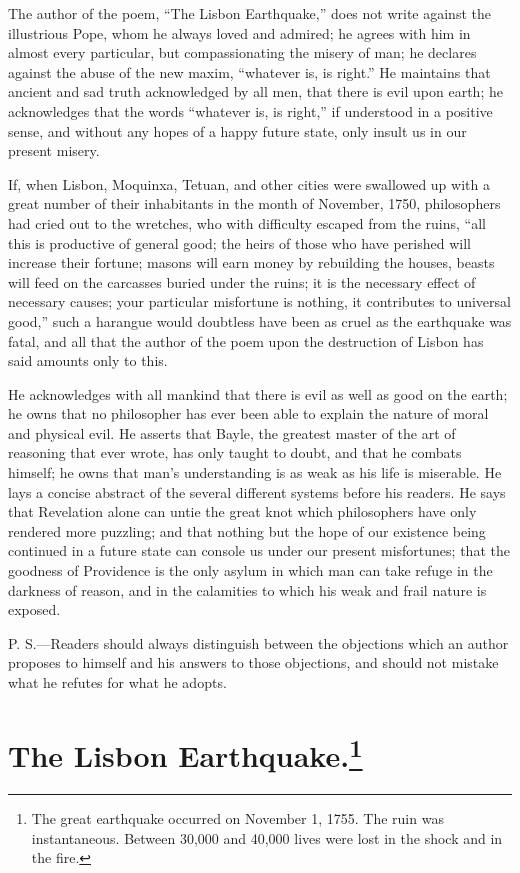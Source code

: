 The author of the poem, ``The Lisbon Earthquake,'' does not write
against the illustrious Pope, whom he always loved and admired; he
agrees with him in almost every particular, but compassionating the
misery of man; he declares against the abuse of the new maxim,
``whatever is, is right.'' He maintains that ancient and sad truth
acknowledged by all men, that there is evil upon earth; he
acknowledges that the words ``whatever is, is right,'' if understood
in a positive sense, and without any hopes of a happy future state,
only insult us in our present misery.

If, when Lisbon, Moquinxa, Tetuan, and other cities were swallowed up
with a great number of their inhabitants in  the month of
November, 1750, philosophers had cried out to the wretches, who with
difficulty escaped from the ruins, ``all this is productive of general
good; the heirs of those who have perished will increase their
fortune; masons will earn money by rebuilding the houses, beasts will
feed on the carcasses buried under the ruins; it is the necessary
effect of necessary causes; your particular misfortune is nothing, it
contributes to universal good,'' such a harangue would doubtless have
been as cruel as the earthquake was fatal, and all that the author of
the poem upon the destruction of Lisbon has said amounts only to this.

He acknowledges with all mankind that there is evil as well as good on
the earth; he owns that no philosopher has ever been able to explain
the nature of moral and physical evil. He asserts that Bayle, the
greatest master of the art of reasoning that ever wrote, has only
taught to doubt, and that he combats himself; he owns that man's
understanding is as weak as his life is miserable. He lays a concise
abstract of the several different systems before his readers. He says
that Revelation alone can untie the great knot which philosophers have
only rendered more puzzling; and that nothing but the hope of our
existence being continued in a future state can console us under our
present misfortunes; that the goodness of Providence is the only
asylum in which man can take refuge in the darkness of reason, and in
the calamities to which his weak and frail nature is exposed.

P. S.---Readers should always distinguish between the objections which
an author proposes to himself and his answers to those objections, and
should not mistake what he refutes for what he adopts.

\section{The Lisbon Earthquake.\footnote{The great earthquake
occurred on November 1, 1755. The ruin was instantaneous. Between
30,000 and 40,000 lives were lost in the shock and in the fire.}}

